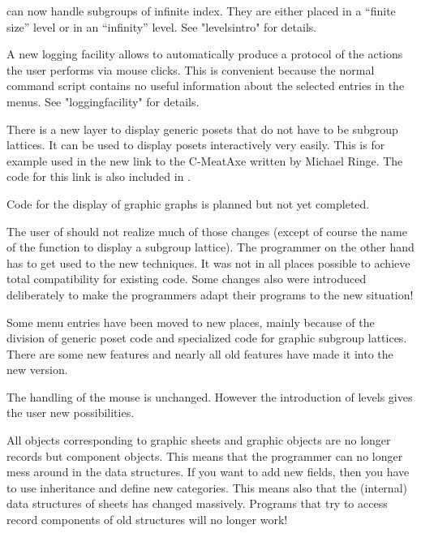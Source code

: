 {\XGAP} can now handle subgroups of infinite index. They are either
placed in a ``finite size'' level or in an ``infinity'' level. See
"levelsintro" for details.

A new logging facility allows to automatically produce a protocol of
the actions the user performs via mouse clicks. This is convenient
because the normal {\GAP} command script contains no useful
information about the selected entries in the menus. See
"loggingfacility" for details.

There is a new layer to display generic posets that do not have to be
subgroup lattices. It can be used to display posets interactively very
easily. This is for example used in the new link to the C-MeatAxe written
by Michael Ringe. The code for this link is also included in {}.

Code for the display of graphic graphs is planned but not yet completed.

The user of {\XGAP} should not realize much of those changes (except of
course the name of the function to display a subgroup lattice). The
programmer on the other hand has to get used to the new techniques. It was
not in all places possible to achieve total compatibility for existing
code. Some changes also were introduced deliberately to make the
programmers adapt their programs to the new situation!



Some menu entries have been moved to new places, mainly because of the
division of generic poset code and specialized code for graphic subgroup
lattices. There are some new features and nearly all old features have made 
it into the new version.

The handling of the mouse is unchanged. However the introduction of levels
gives the user new possibilities.


All {\GAP} objects corresponding to graphic sheets and graphic objects are
no longer records but component objects. This means that the programmer can 
no longer mess around in the data structures. If you want to add new
fields, then you have to use inheritance and define new categories. This
means also that the (internal) data structures of sheets has changed
massively. Programs that try to access record components of old {\XGAP}
structures will no longer work!

